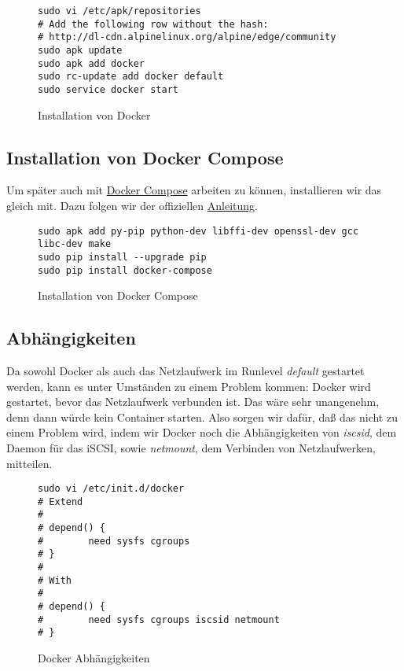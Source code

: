 \documentclass[12pt,a4paper]{article}
\newcommand{\code}[1]{\textit{#1}}
\begin{document}
\begin{figure}[H]
\begin{lstlisting}
sudo vi /etc/apk/repositories
# Add the following row without the hash:
# http://dl-cdn.alpinelinux.org/alpine/edge/community
sudo apk update
sudo apk add docker
sudo rc-update add docker default
sudo service docker start
\end{lstlisting}
\caption{Installation von Docker}\label{fig:Installation von Docker}
\end{figure}

\subsection{Installation von Docker Compose}
Um später auch mit \href{https://docs.docker.com/compose/}{Docker Compose} arbeiten zu können, installieren wir das
gleich mit. Dazu folgen wir der offiziellen \href{https://docs.docker.com/compose/install/}{Anleitung}.

\begin{figure}[H]
\begin{lstlisting}
sudo apk add py-pip python-dev libffi-dev openssl-dev gcc libc-dev make
sudo pip install --upgrade pip
sudo pip install docker-compose
\end{lstlisting}
\caption{Installation von Docker Compose}\label{fig:Installation von Docker Compose}
\end{figure}

\subsection{Abhängigkeiten}
Da sowohl Docker als auch das Netzlaufwerk im Runlevel \code{default} gestartet werden, kann es unter Umständen zu einem
Problem kommen: Docker wird gestartet, bevor das Netz\-laufwerk verbunden ist. Das wäre sehr unangenehm, denn dann würde
kein Container starten. Also sorgen wir dafür, daß das nicht zu einem Problem wird, indem wir Docker noch die
Abhängigkeiten von \code{iscsid}, dem Daemon für das iSCSI, sowie \code{netmount}, dem Verbinden von Netzlaufwerken,
mitteilen.

\begin{figure}[H]
\begin{lstlisting}
sudo vi /etc/init.d/docker
# Extend
#
# depend() {
#        need sysfs cgroups
# }
#
# With
#
# depend() {
#        need sysfs cgroups iscsid netmount
# }
\end{lstlisting}
\caption{Docker Abhängigkeiten}\label{fig:Docker Abhängigkeiten}
\end{figure}
\end{document}
